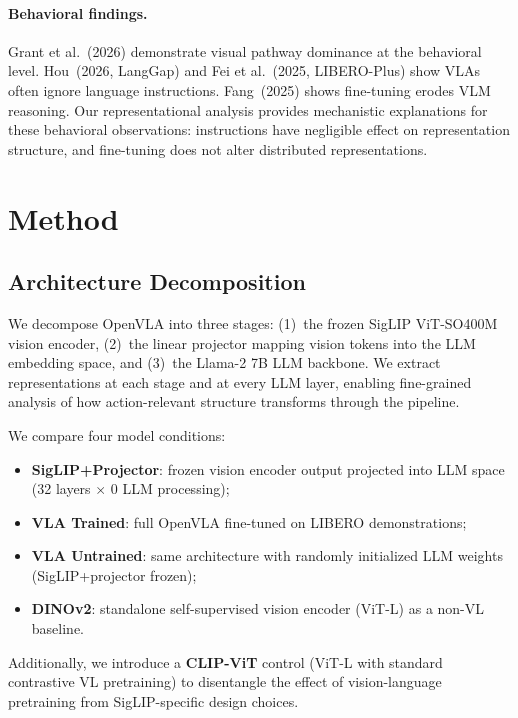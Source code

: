 \documentclass[letterpaper]{article}
\begin{document}
\paragraph{Behavioral findings.}
Grant et al.~(2026) demonstrate visual pathway dominance at the behavioral level. Hou~(2026, LangGap) and Fei et al.~(2025, LIBERO-Plus) show VLAs often ignore language instructions. Fang~(2025) shows fine-tuning erodes VLM reasoning. Our representational analysis provides mechanistic explanations for these behavioral observations: instructions have negligible effect on representation structure, and fine-tuning does not alter distributed representations.

\section{Method}
\label{sec:method}

\subsection{Architecture Decomposition}
We decompose OpenVLA into three stages: (1)~the frozen SigLIP ViT-SO400M vision encoder, (2)~the linear projector mapping vision tokens into the LLM embedding space, and (3)~the Llama-2 7B LLM backbone. We extract representations at each stage and at every LLM layer, enabling fine-grained analysis of how action-relevant structure transforms through the pipeline.

We compare four model conditions:
\begin{itemize}
    \item \textbf{SigLIP+Projector}: frozen vision encoder output projected into LLM space (32 layers $\times$ 0 LLM processing);
    \item \textbf{VLA Trained}: full OpenVLA fine-tuned on LIBERO demonstrations;
    \item \textbf{VLA Untrained}: same architecture with randomly initialized LLM weights (SigLIP+projector frozen);
    \item \textbf{DINOv2}: standalone self-supervised vision encoder (ViT-L) as a non-VL baseline.
\end{itemize}

Additionally, we introduce a \textbf{CLIP-ViT} control (ViT-L with standard contrastive VL pretraining) to disentangle the effect of vision-language pretraining from SigLIP-specific design choices.
\end{document}
